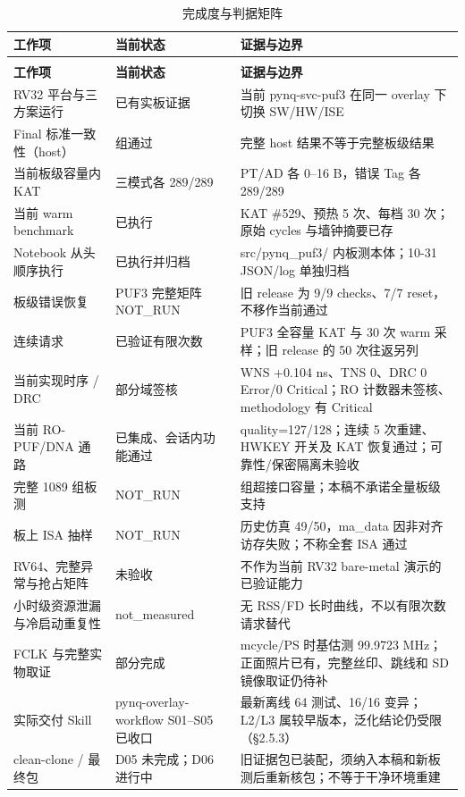{\small
\setlength{\tabcolsep}{4pt}
\renewcommand{\thetable}{3-16}
\begin{longtable}{@{}>{\raggedright\arraybackslash}p{}>{\raggedright\arraybackslash}p{}>{\raggedright\arraybackslash}p{}@{}}
\caption{完成度与判据矩阵}\label{tab:3-16}\\
\toprule
\textbf{工作项} & \textbf{当前状态} & \textbf{证据与边界} \\
\midrule
\endfirsthead
\multicolumn{3}{@{}l}{\footnotesize 续表 3-16}\\
\toprule
\textbf{工作项} & \textbf{当前状态} & \textbf{证据与边界} \\
\midrule
\endhead
RV32 平台与三方案运行 & 已有实板证据 & 当前 pynq-svc-puf3 在同一 overlay 下切换 SW/HW/ISE \\
Final 标准一致性（host） & 1089 组通过 & 完整 host 结果不等于完整板级结果 \\
当前板级容量内 KAT & 三模式各 289/289 & PT/AD 各 0--16 B，错误 Tag 各 289/289 \\
当前 warm benchmark & 已执行 & KAT \#529、预热 5 次、每档 30 次；原始 cycles 与墙钟摘要已存 \\
Notebook 从头顺序执行 & 已执行并归档 & src/pynq\_puf3/ 内板测本体；10-31 JSON/log 单独归档 \\
板级错误恢复 & PUF3 完整矩阵 NOT\_RUN & 旧 release 为 9/9 checks、7/7 reset，不移作当前通过 \\
连续请求 & 已验证有限次数 & PUF3 全容量 KAT 与 30 次 warm 采样；旧 release 的 50 次往返另列 \\
当前实现时序 / DRC & 部分域签核 & WNS +0.104 ns、TNS 0、DRC 0 Error/0 Critical；RO 计数器未签核、methodology 有 Critical \\
当前 RO-PUF/DNA 通路 & 已集成、会话内功能通过 & quality=127/128；连续 5 次重建、HWKEY 开关及 KAT 恢复通过；可靠性/保密隔离未验收 \\
完整 1089 组板测 & NOT\_\allowbreak{}RUN & 800 组超接口容量；本稿不承诺全量板级支持 \\
板上 ISA 抽样 & NOT\_\allowbreak{}RUN & 历史仿真 49/50，ma\_\allowbreak{}data 因非对齐访存失败；不称全套 ISA 通过 \\
RV64、完整异常与抢占矩阵 & 未验收 & 不作为当前 RV32 bare-metal 演示的已验证能力 \\
小时级资源泄漏与冷启动重复性 & not\_\allowbreak{}measured & 无 RSS/FD 长时曲线，不以有限次数请求替代 \\
FCLK 与完整实物取证 & 部分完成 & mcycle/PS 时基估测 99.9723 MHz；正面照片已有，完整丝印、跳线和 SD 镜像取证仍待补 \\
实际交付 Skill & pynq-overlay-workflow S01--S05 已收口 & 最新离线 64 测试、16/16 变异；L2/L3 属较早版本，泛化结论仍受限（§2.5.3） \\
clean-clone / 最终包 & D05 未完成；D06 进行中 & 旧证据包已装配，须纳入本稿和新板测后重新核包；不等于干净环境重建 \\
\bottomrule
\end{longtable}
}

